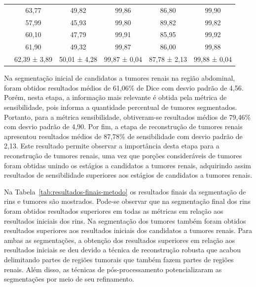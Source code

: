 \begin{table}[!ht]
{\begin{tabular}{c|c|c|c|c|c}
                                                                                                           & 63,77        & 49,82        & 99,86        & 86,80        & 99,90        \\ \cline{2-6} 
                                                                                                           & 57,99        & 45,93        & 99,80        & 89,82        & 99,82        \\ \cline{2-6} 
                                                                                                           & 60,10        & 47,79        & 99,91        & 85,95        & 99,92        \\ \cline{2-6} 
                                                                                                           & 61,90        & 49,32        & 99,87        & 86,00        & 99,88        \\ \cline{2-6} 
                                                                                                           & 62,39 ± 3,89 & 50,01 ± 4,28 & 99,87 ± 0,04 & 87,78 ± 2,13 & 99,88 ± 0,04 \\ \hline
\end{tabular}
}
\end{table}

Na segmentação inicial de candidatos a tumores renais na região abdominal, foram obtidos resultados médios de 61,06\% de Dice com desvio padrão de 4,56. Porém, nesta etapa, a informação mais relevante é obtida pela métrica de sensibilidade, pois informa a quantidade percentual de tumores segmentados. Portanto, para a métrica sensibilidade, obtiveram-se resultados médios de 79,46\% com desvio padrão de 4,90. Por fim, a etapa de reconstrução de tumores renais apresentou resultados médios de 87,78\% de sensibilidade com desvio padrão de 2,13. Este resultado permite observar a importância desta etapa para a reconstrução de tumores renais, uma vez que porções consideráveis de tumores foram obtidas unindo os estágios a candidatos a tumores renais, adquirindo assim resultados de sensibilidade superiores aos estágios de candidatos a tumores renais.

Na Tabela~\ref{tab:resultados-finais-metodo} os resultados finais da segmentação de rins e tumores são mostrados. Pode-se observar que na segmentação final dos rins foram obtidos resultados superiores em todas as métricas em relação aos resultados iniciais dos rins. Na segmentação dos tumores também foram obtidos resultados superiores aos resultados iniciais dos candidatos a tumores renais. Para ambas as segmentações, a obtenção dos resultados superiores em relação aos resultados iniciais se deu devido a técnica de reconstrução robusta que acabou delimitando partes de regiões tumorais que também fazem partes de regiões renais. Além disso, as técnicas de pós-processamento potencializaram as segmentações por meio de seu refinamento.

